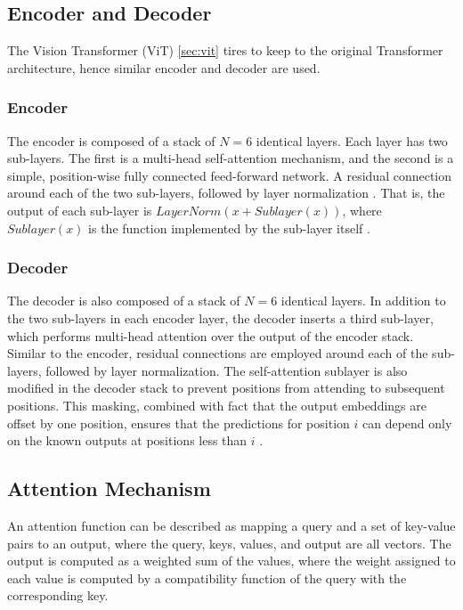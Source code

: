\documentclass[12pt, a4paper]{report}
\begin{document}
\subsection{Encoder and Decoder}
\label{subsec:encdec}

\hspace{0.5cm} The Vision Transformer (ViT) \eqref{sec:vit} tires to keep to the original Transformer architecture, hence similar encoder and decoder are used.

\subsubsection{Encoder}
The encoder is composed of a stack of $N = 6$ identical layers. Each layer has two sub-layers. The first is a multi-head self-attention mechanism, and the second is a simple, position-wise fully connected feed-forward network. A residual connection \cite{2016arXiv160202410J} around each of the two sub-layers, followed by layer normalization \cite{2016arXiv160706450L}. That is, the output of each sub-layer is $LayerNorm(x + Sublayer(x))$, where $Sublayer(x)$ is the function implemented by the sub-layer itself \cite{2017arXiv170603762V}.

\subsubsection{Decoder}
The decoder is also composed of a stack of $N = 6$ identical layers. In addition to the two sub-layers in each encoder layer, the decoder inserts a third sub-layer, which performs multi-head attention over the output of the encoder stack. Similar to the encoder, residual connections are employed around each of the sub-layers, followed by layer normalization. The self-attention sublayer is also modified in the decoder stack to prevent positions from attending to subsequent positions. This masking, combined with fact that the output embeddings are offset by one position, ensures that the predictions for position $i$ can depend only on the known outputs at positions less than $i$ \cite{2017arXiv170603762V}.

\subsection{Attention Mechanism}
\label{subsec:attnmec}

\hspace{0.5cm} An attention function can be described as mapping a query and a set of key-value pairs to an output, where the query, keys, values, and output are all vectors. The output is computed as a weighted sum of the values, where the weight assigned to each value is computed by a compatibility function of the query with the corresponding key.
\end{document}
